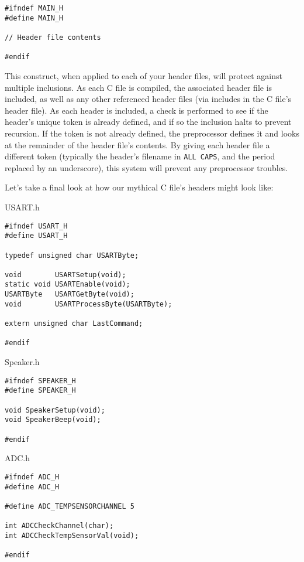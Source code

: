 \documentclass[a4paper,oneside,notitlepage]{article}
\begin{document}
\begin{center}
\begin{lstlisting}
#ifndef MAIN_H
#define MAIN_H

// Header file contents

#endif
\end{lstlisting}
\end{center}

This construct, when applied to each of your header files, will protect against multiple inclusions. As each C file is compiled, the associated header file is included, as well as any other referenced header files (via includes in the C file's header file). As each header is included, a check is performed to see if the header's unique token is already defined, and if so the inclusion halts to prevent recursion. If the token is not already defined, the preprocessor defines it and looks at the remainder of the header file's contents. By giving each header file a different token (typically the header's filename in \texttt{ALL CAPS}, and the period replaced by an underscore), this system will prevent any preprocessor troubles.

Let's take a final look at how our mythical C file's headers might look like:

USART.h
\begin{center}
\begin{lstlisting}
#ifndef USART_H
#define USART_H

typedef unsigned char USARTByte;

void        USARTSetup(void);
static void USARTEnable(void);
USARTByte   USARTGetByte(void);
void        USARTProcessByte(USARTByte);

extern unsigned char LastCommand;

#endif
\end{lstlisting}
\end{center}

Speaker.h
\begin{center}
\begin{lstlisting}
#ifndef SPEAKER_H
#define SPEAKER_H

void SpeakerSetup(void);
void SpeakerBeep(void);

#endif
\end{lstlisting}
\end{center}

ADC.h
\begin{center}
\begin{lstlisting}
#ifndef ADC_H
#define ADC_H

#define ADC_TEMPSENSORCHANNEL 5

int ADCCheckChannel(char);
int ADCCheckTempSensorVal(void);

#endif
\end{lstlisting}
\end{center}
\end{document}
